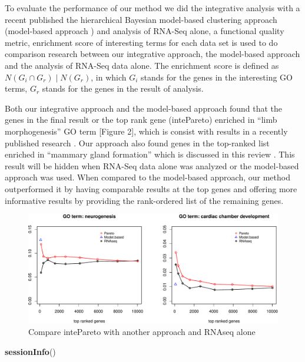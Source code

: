 \documentclass[10pt,]{article}
\newenvironment{Shaded}{\begin{snugshade}}{\end{snugshade}}
\newcommand{\KeywordTok}[1]{\textcolor[rgb]{0.13,0.29,0.53}{\textbf{#1}}}
\newcommand{\NormalTok}[1]{#1}
\begin{document}
To evaluate the performance of our method we did the integrative
analysis with a recent published the hierarchical Bayesian model-based
clustering approach (model-based approach )\autocite{Schafer2017} and
analysis of RNA-Seq alone, a functional quality metric, enrichment score
of interesting terms for each data set is used to do comparison research
between our integrative approach, the model-based approach and the
analysis of RNA-Seq data alone. The enrichment score is defined as
\(N(G_i \cap G_r) \mid N(G_r)\), in which \(G_i\) stands for the genes
in the interesting GO terms, \(G_r\) stands for the genes in the result
of analysis.

Both our integrative approach and the model-based approach found that
the genes in the final result or the top rank gene (intePareto) enriched
in ``limb morphogenesis'' GO term {[}Figure 2{]}, which is consist with
results in a recently published research \autocite{li2018}. Our approach
also found genes in the top-ranked list enriched in ``mammary gland
formation'' which is discussed in this review \autocite{holliday2018}.
This result will be hidden when RNA-Seq data alone was analyzed or the
model-based approach was used. When compared to the model-based
approach\autocite{schafer2017}, our method outperformed it by having
comparable results at the top genes and offering more informative
results by providing the rank-ordered list of the remaining genes.

\begin{figure}
\centering
\includegraphics{supplement_file_files/figure-latex/unnamed-chunk-17-1.pdf}
\caption{Compare intePareto with another approach and RNAseq alone}
\end{figure}

\begin{Shaded}
\begin{Highlighting}[]
\KeywordTok{sessionInfo}\NormalTok{()}
\end{Highlighting}
\end{Shaded}
\end{document}

